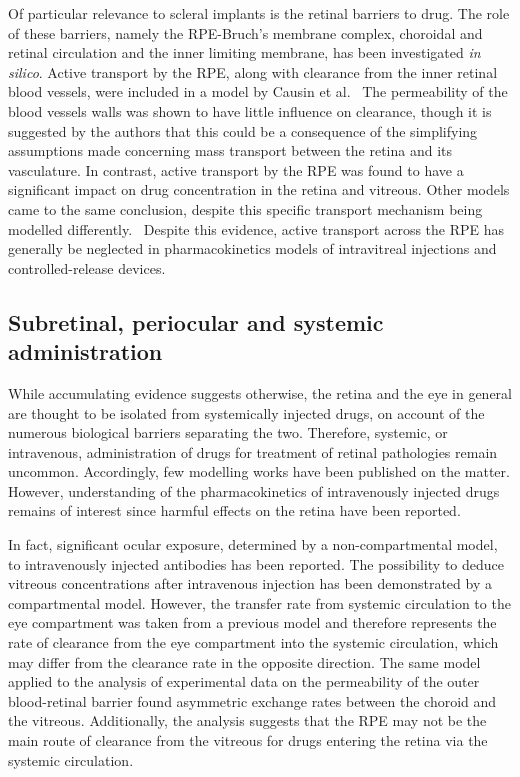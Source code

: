 \documentclass{article}
\begin{document}
Of particular relevance to scleral implants is the retinal barriers to drug.
The role of these barriers, namely the RPE-Bruch's membrane complex, choroidal and retinal circulation and the inner limiting membrane, has been investigated \textit{in silico}.
Active transport by the RPE, along with clearance from the inner retinal blood vessels, were included in a model by Causin et al.~\cite{Causin_2016}
The permeability of the blood vessels walls was shown to have little influence on clearance, though it is suggested by the authors that this could be a consequence of the simplifying assumptions made concerning mass transport between the retina and its vasculature.
In contrast, active transport by the RPE was found to have a significant impact on drug concentration in the retina and vitreous.
Other models came to the same conclusion, despite this specific transport mechanism being modelled differently.~\cite{Balachandran_2008,Kotha_2014}
Despite this evidence, active transport across the RPE has generally be neglected in pharmacokinetics models of intravitreal injections and controlled-release devices.


\subsection*{Subretinal, periocular and systemic administration}

While accumulating evidence suggests otherwise, the retina and the eye in general are thought to be isolated from systemically injected drugs, on account of the numerous biological barriers separating the two.
Therefore, systemic, or intravenous, administration of drugs for treatment of retinal pathologies remain uncommon.
Accordingly, few modelling works have been published on the matter.
However, understanding of the pharmacokinetics of intravenously injected drugs remains of interest since harmful effects on the retina have been reported.\cite{Fu_2017}

In fact, significant ocular exposure, determined by a non-compartmental model, to intravenously injected antibodies has been reported.\cite{Shivva_2021}
The possibility to deduce vitreous concentrations after intravenous injection has been demonstrated by a compartmental model.\cite{Vellonen_2015}
However, the transfer rate from systemic circulation to the eye compartment was taken from a previous model and therefore represents the rate of clearance from the eye compartment into the systemic circulation, which may differ from the clearance rate in the opposite direction.
The same model applied to the analysis of experimental data on the permeability of the outer blood-retinal barrier found asymmetric exchange rates between the choroid and the vitreous.\cite{Ramsay_2019}
Additionally, the analysis suggests that the RPE may not be the main route of clearance from the vitreous for drugs entering the retina via the systemic circulation.\cite{Ramsay_2019}
\end{document}
